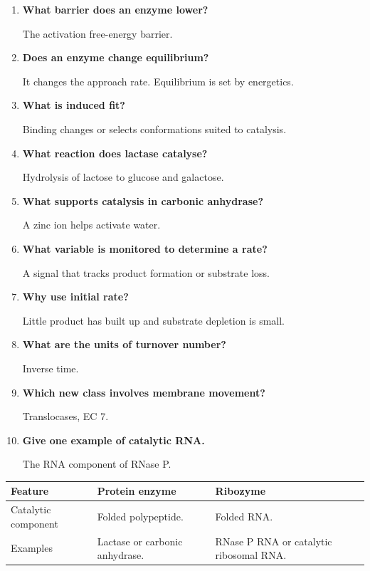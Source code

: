 \documentclass[12pt,a4paper]{article}
\newcommand{\Q}[1]{\textbf{#1}\par\noindent\ignorespaces}
\begin{document}
\begin{tcolorbox}[exambox, title={Frequently Asked / Viva Questions}]
\begin{enumerate}[topsep=0pt, label=\textbf{Q\arabic*.}, itemsep=5pt, leftmargin=*]
  \item \Q{What barrier does an enzyme lower?}
    The activation free-energy barrier.
  \item \Q{Does an enzyme change equilibrium?}
    It changes the approach rate. Equilibrium is set by energetics.
  \item \Q{What is induced fit?}
    Binding changes or selects conformations suited to catalysis.
  \item \Q{What reaction does lactase catalyse?}
    Hydrolysis of lactose to glucose and galactose.
  \item \Q{What supports catalysis in carbonic anhydrase?}
    A zinc ion helps activate water.
  \item \Q{What variable is monitored to determine a rate?}
    A signal that tracks product formation or substrate loss.
  \item \Q{Why use initial rate?}
    Little product has built up and substrate depletion is small.
  \item \Q{What are the units of turnover number?}
    Inverse time.
  \item \Q{Which new class involves membrane movement?}
    Translocases, EC 7.
  \item \Q{Give one example of catalytic RNA.}
    The RNA component of RNase P.
\end{enumerate}
\end{tcolorbox}

\begin{tcolorbox}[tikzbox, title={Summary Comparison}]
\par\vspace{5pt}
\begingroup
\setlength{\extrarowheight}{1pt}
\noindent\begin{tabularx}{\linewidth}{|B{3.45cm}|Y|Y|}
\hline
\textbf{Feature} & \textbf{Protein enzyme} & \textbf{Ribozyme} \\ \hline
Catalytic component & Folded polypeptide. & Folded RNA. \\ \hline
Examples & Lactase or carbonic anhydrase. & RNase P RNA or catalytic ribosomal RNA. \\ \hline
\end{tabularx}\par
\endgroup
\end{tcolorbox}
\end{document}
